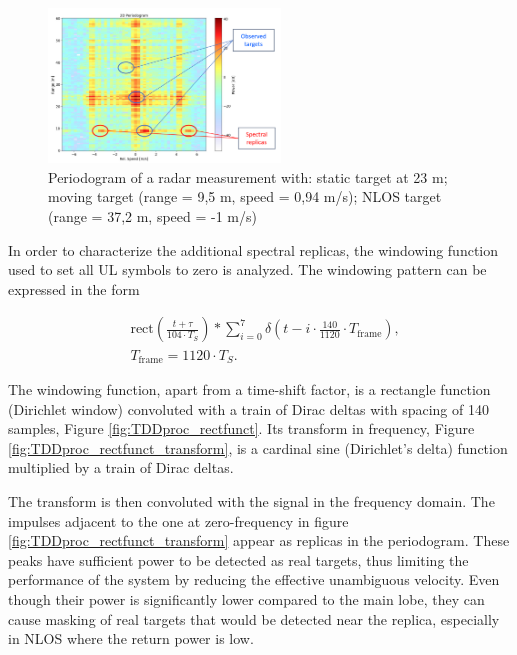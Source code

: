     \begin{figure}[H]
        \centering
        \includegraphics[width=0.55\textwidth]{Images/TDDprocessing/SpectralReplicasDLULpattern.png}
        \caption{Periodogram of a radar measurement with: static target at 23 m; moving target (range = 9,5 m, speed = 0,94 m/s); NLOS target (range = 37,2 m, speed = -1 m/s)}
        \label{fig:SpectralReplicasDLULpattern}
    \end{figure}
    
    In order to characterize the additional spectral replicas, the windowing function used to set all UL symbols to zero is analyzed. The windowing pattern can be expressed in the form
    
    \begin{align}
        &\text{rect}\left( \frac{t + \tau}{104 \cdot T_S}\right) \ast \sum_{i=0}^7 \delta\left( t - i\cdot \frac{140}{1120}\cdot T_{\text{frame}} \right),  \\
        &T_{\text{frame}} = 1120 \cdot T_S.
    \end{align}

    The windowing function, apart from a time-shift factor, is a rectangle function (Dirichlet window) convoluted with a train of Dirac deltas with spacing of 140 samples, Figure \ref{fig:TDDproc_rectfunct}. Its transform in frequency, Figure \ref{fig:TDDproc_rectfunct_transform}, is a cardinal sine (Dirichlet's delta) function multiplied by a train of Dirac deltas.

    The transform is then convoluted with the signal in the frequency domain. The impulses adjacent to the one at zero-frequency in figure \ref{fig:TDDproc_rectfunct_transform} appear as replicas in the periodogram. These peaks have sufficient power to be detected as real targets, thus limiting the performance of the system by reducing the effective unambiguous velocity. Even though their power is significantly lower compared to the main lobe, they can cause masking of real targets that would be detected near the replica, especially in NLOS where the return power is low. 

